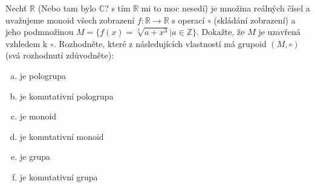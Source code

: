 Nechť $\mathbb{R}$ (Nebo tam bylo $\mathbb{C}$? s tím $\mathbb{R}$ mi to moc
nesedí) je množina reálných čísel a uvažujeme monoid všech zobrazení $f:
\mathbb{R} \rightarrow \mathbb{R}$ s operací $\circ$ (skládání zobrazení) a jeho
podmnožinou $M = \{f(x) = \sqrt[3]{a+x^3} | a \in \mathbb{Z}\}$.
Dokažte, že $M$ je uzavřená vzhledem k $\circ$.
Rozhodněte, které z následujících vlastností má grupoid $(M, \circ)$ (svá
rozhodnutí zdůvodněte):
\begin{enumerate}[a)]
	\item je pologrupa
	\item je komutativní pologrupa
	\item je monoid
	\item je komutativní monoid
	\item je grupa
	\item je komutativní grupa
\end{enumerate}
